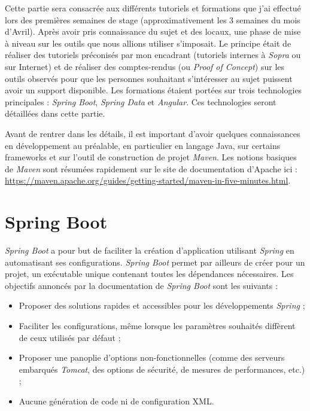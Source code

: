 \documentclass{polytech/polytech}
\begin{document}
Cette partie sera consacrée aux différents tutoriels et formations que j'ai effectué lors des premières semaines de stage (approximativement les 3 semaines du mois d'Avril). Après avoir pris connaissance du sujet et des locaux, une phase de mise à niveau sur les outils que nous allions utiliser s'imposait. Le principe était de réaliser des tutoriels préconisés par mon encadrant (tutoriels internes à \textit{Sopra} ou sur Internet) et de réaliser des comptes-rendus (ou \textit{Proof of Concept}) sur les outils observés pour que les personnes souhaitant s'intéresser au sujet puissent avoir un support disponible. Les formations étaient portées sur trois technologies principales : \textit{Spring Boot}, \textit{Spring Data} et \textit{Angular}. Ces technologies seront détaillées dans cette partie.

Avant de rentrer dans les détails, il est important d'avoir quelques connaissances en développement au préalable, en particulier en langage Java, sur certains frameworks et sur l'outil de construction de projet \textit{Maven}. Les notions basiques de \textit{Maven} sont résumées rapidement sur le site de documentation d'Apache ici : \url{https://maven.apache.org/guides/getting-started/maven-in-five-minutes.html}.


\chapter{Spring Boot}


\textit{Spring Boot} a pour but de faciliter la création d'application utilisant \textit{Spring} en automatisant ses configurations. \textit{Spring Boot} permet par ailleurs de créer pour un projet, un exécutable unique contenant toutes les dépendances nécessaires. Les objectifs annoncés par la documentation de \textit{Spring Boot} sont les suivants : 

\begin{itemize}
	\item Proposer des solutions rapides et accessibles pour les développements \textit{Spring} ;
	\item Faciliter les configurations, même lorsque les paramètres souhaités diffèrent de ceux utilisés par défaut ;
	\item Proposer une panoplie d'options non-fonctionnelles (comme des serveurs embarqués \textit{Tomcat}, des options de sécurité, de mesures de performances, etc.) ;
	\item Aucune génération de code ni de configuration XML. 
\end{itemize}
\end{document}

